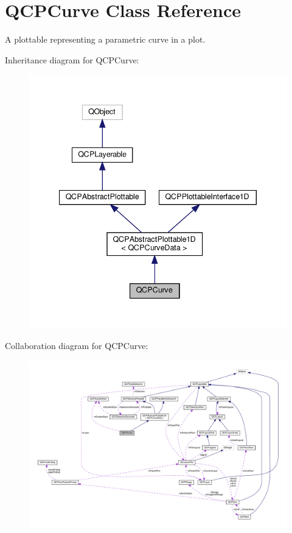 \hypertarget{classQCPCurve}{}\section{Q\+C\+P\+Curve Class Reference}
\label{classQCPCurve}


A plottable representing a parametric curve in a plot.  




Inheritance diagram for Q\+C\+P\+Curve\+:\nopagebreak
\begin{figure}[H]
\begin{center}
\leavevmode
\includegraphics[width=340pt]{classQCPCurve__inherit__graph}
\end{center}
\end{figure}


Collaboration diagram for Q\+C\+P\+Curve\+:\nopagebreak
\begin{figure}[H]
\begin{center}
\leavevmode
\includegraphics[width=350pt]{classQCPCurve__coll__graph}
\end{center}
\end{figure}
